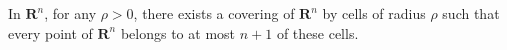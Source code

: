 In $\mathbf{R}^n$, for any $\rho > 0$, there exists a covering of $\mathbf{R}^n$ by cells of radius $\rho$ such that every point of $\mathbf{R}^n$ belongs to at most $n+1$ of these cells.
